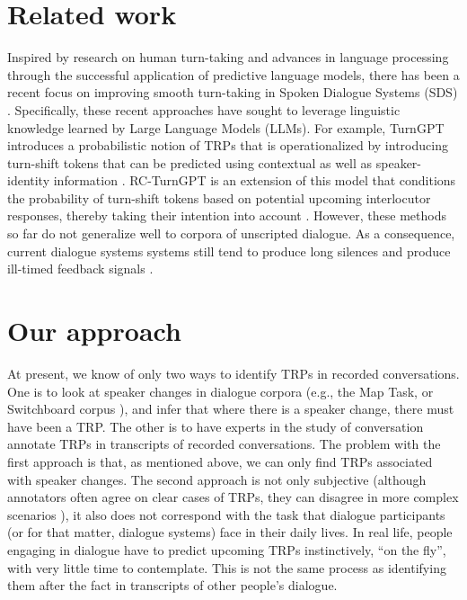 \section{Related work}
Inspired by research on human turn-taking and advances in language processing through the successful application of predictive language models, there has been a recent focus on improving smooth turn-taking in Spoken Dialogue Systems (SDS) \citep{Ni2021RecentAI}. Specifically, these recent approaches have sought to leverage linguistic knowledge learned by Large Language Models (LLMs). For example, TurnGPT introduces a probabilistic notion of TRPs that is operationalized by introducing turn-shift tokens that can be predicted using contextual as well as speaker-identity information \citep{ekstedt2020turngpt}. RC-TurnGPT is an extension of this model that conditions the probability of turn-shift tokens based on potential upcoming interlocutor responses, thereby taking their intention into account \citep{jiang-etal-2023-response}. However, these methods so far do not generalize well to corpora of unscripted dialogue. As a consequence, current dialogue systems systems still tend to produce long silences and produce ill-timed feedback signals \cite{skantze2021turnreview}.


\section{Our approach}

At present, we know of only two ways to identify TRPs in recorded conversations. One is to look at speaker changes in dialogue corpora (e.g., the Map Task, or Switchboard corpus \cite{godfrey1993switchboard, anderson1991hcrc}), and infer that where there is a speaker change, there must have been a TRP. The other is to have experts in the study of conversation annotate TRPs in transcripts of recorded conversations. The problem with the first approach is that, as mentioned above, we can only find TRPs associated with speaker changes. The second approach is not only subjective (although annotators often agree on clear cases of TRPs, they can disagree in more complex scenarios \cite{uro2024annotation}), it also does not correspond with the task that dialogue participants (or for that matter, dialogue systems) face in their daily lives. In real life, people engaging in dialogue have to predict upcoming TRPs instinctively, ``on the fly'', with very little time to contemplate. This is not the same process as identifying them after the fact in transcripts of other people's dialogue.


